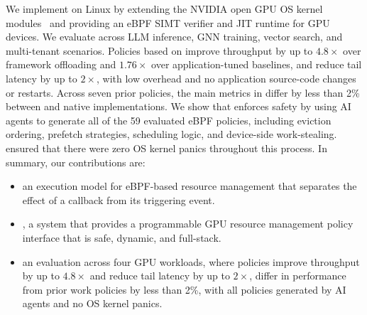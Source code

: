 

We implement \sys{} on Linux by extending the NVIDIA open GPU OS kernel modules~\cite{nvidia-open-gpu} and providing an eBPF SIMT verifier and JIT runtime for GPU devices.
We evaluate \sys{} across LLM inference, GNN training, vector search, and multi-tenant scenarios.
Policies based on \sys improve throughput by up to $4.8\times$ over framework offloading and $1.76\times$ over application-tuned baselines, and reduce tail latency by up to $2\times$, with low overhead and no application source-code changes or restarts.
Across seven prior policies, the main metrics in  differ by less than 2\% between \sys{} and native implementations.
We show that \sys{} enforces safety by using AI agents to generate all of the 59 evaluated eBPF policies, including eviction ordering, prefetch strategies, scheduling logic, and device-side work-stealing.
\sys{} ensured that there were zero OS kernel panics throughout this process.
In summary, our contributions are:

\begin{itemize}[leftmargin=*,itemsep=0pt]
  \item an execution model for eBPF-based resource management that separates the effect of a callback from its triggering event.
  \item \sys, a system that provides a programmable GPU resource management policy interface that is safe, dynamic, and full-stack.
  \item an evaluation across four GPU workloads, where \sys{} policies improve throughput by up to $4.8\times$ and reduce tail latency by up to $2\times$, differ in performance from prior work policies by less than 2\%, with all policies generated by AI agents and no OS kernel panics.
\end{itemize}
